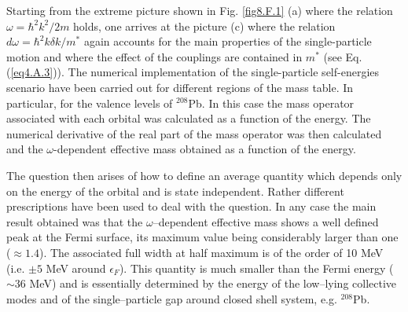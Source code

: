 \begin{subappendices}
Starting from the extreme picture shown in Fig. \ref{fig8.F.1} (a) where the relation $\omega=\hbar^2k^2/2m$ holds, one arrives at the picture (c) where the relation $d\omega=\hbar^2k\delta k/m^*$ again accounts for the main properties of the single-particle motion and where the effect of the couplings are contained in $m^*$ (see Eq. (\ref{eq4.A.3})). The numerical implementation of the single-particle self-energies scenario have been carried out for different regions of the mass table. In particular, for the valence levels of $^{208}$Pb. In this case the mass operator associated with each orbital was calculated as a function of the energy. The numerical derivative of the real part of the mass operator was then calculated and the $\omega$-dependent effective mass obtained as a function of the energy.


The question then arises of how to define an average quantity which depends only on the energy of the orbital and is state independent. Rather different prescriptions have been used to deal with the question. In any case the main result obtained was that the $\omega$--dependent effective mass shows a well defined peak at the Fermi surface, its maximum value being considerably larger than one ($\approx 1.4$). The associated full width at half maximum is of the order of 10 MeV (i.e. $\pm 5$ MeV around $\epsilon_F$). This quantity is much smaller than the Fermi energy ($\sim 36$ MeV) and is essentially determined by the energy of the low--lying collective modes and of the single--particle gap around closed shell system, e.g. $^{208}$Pb.

\end{subappendices}







\renewcommand{\bibname}{Bibliography Ch 4}

%
 
